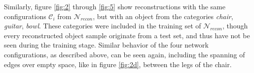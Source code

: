   Similarly, figure \ref{fig:2} through \ref{fig:5} show reconstructions with the same configurations $\mathcal{C}_i$ from $\mathcal{N}_{recon}$,
  but with an object from the categories \emph{chair}, \emph{guitar}, \emph{bowl}. These categories were included
  in the training set of $\mathcal{N}_{recon}$, though every reconstructed object sample originate from a test set, and thus have not be seen
  during the training stage.
  Similar behavior of the four network configurations, as described above, can be seen again, including the spanning of edges over empty space,
  like in figure \ref{fig:2d}, between the legs of the chair.


